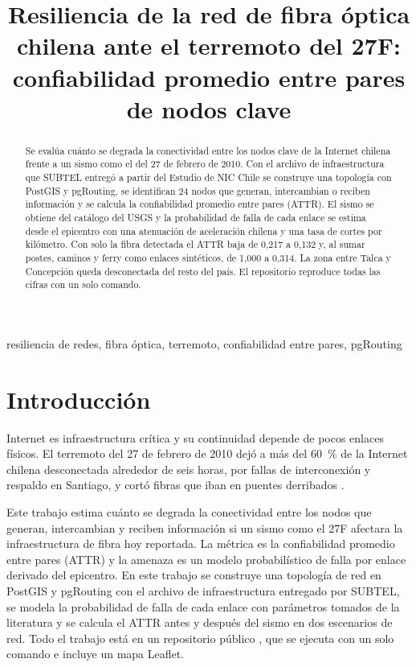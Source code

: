 \documentclass[conference]{IEEEtran}
\begin{document}
\title{Resiliencia de la red de fibra óptica chilena ante el terremoto del 27F:
confiabilidad promedio entre pares de nodos clave}

\author{
}

\maketitle

\begin{abstract}
Se evalúa cuánto se degrada la conectividad entre los nodos clave de la Internet chilena frente a un sismo como el del 27 de febrero de 2010.
Con el archivo de infraestructura que SUBTEL entregó a partir del Estudio de NIC Chile se construye una topología con PostGIS y pgRouting, se identifican 24 nodos que generan, intercambian o reciben información y se calcula la confiabilidad promedio entre pares (ATTR).
El sismo se obtiene del catálogo del USGS y la probabilidad de falla de cada enlace se estima desde el epicentro con una atenuación de aceleración chilena y una tasa de cortes por kilómetro.
Con solo la fibra detectada el ATTR baja de 0,217 a 0,132 y, al sumar postes, caminos y ferry como enlaces sintéticos, de 1,000 a 0,314.
La zona entre Talca y Concepción queda desconectada del resto del país.
El repositorio reproduce todas las cifras con un solo comando.
\end{abstract}

\begin{IEEEkeywords}
resiliencia de redes, fibra óptica, terremoto, confiabilidad entre pares, pgRouting
\end{IEEEkeywords}

\section{Introducción}
\label{sec:intro}
Internet es infraestructura crítica y su continuidad depende de pocos enlaces físicos.
El terremoto del 27 de febrero de 2010 dejó a más del \SI{60}{\percent} de la Internet chilena desconectada alrededor de seis horas, por fallas de interconexión y respaldo en Santiago, y cortó fibras que iban en puentes derribados \cite{niclabs2018}.

Este trabajo estima cuánto se degrada la conectividad entre los nodos que generan, intercambian y reciben información si un sismo como el 27F afectara la infraestructura de fibra hoy reportada.
La métrica es la confiabilidad promedio entre pares (ATTR) \cite{boettcher2018} y la amenaza es un modelo probabilístico de falla por enlace derivado del epicentro.
En este trabajo se construye una topología de red en PostGIS y pgRouting con el archivo de infraestructura entregado por SUBTEL, se modela la probabilidad de falla de cada enlace con parámetros tomados de la literatura y se calcula el ATTR antes y después del sismo en dos escenarios de red.
Todo el trabajo está en un repositorio público \cite{repositorio}, que se ejecuta con un solo comando e incluye un mapa Leaflet.
\end{document}
